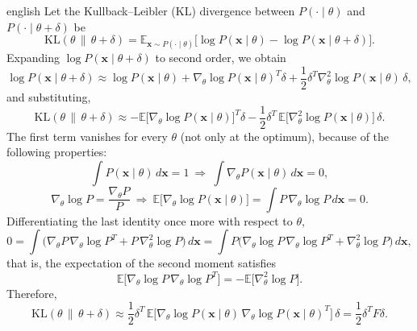 \documentclass[../0000.tex]{subfiles}
\begin{document}
\begin{hyphenrules}{english}
Let the Kullback--Leibler (KL) divergence between $P(\cdot\mid\theta)$ and $P(\cdot\mid\theta+\delta)$ be
\cite{pascanu2013}
\[
  \mathrm{KL}(\theta\,\|\,\theta+\delta)=\mathbb{E}_{\mathbf{x}\sim P(\cdot\mid\theta)}\big[\log P(\mathbf{x}\mid\theta)-\log P(\mathbf{x}\mid\theta+\delta)\big].
\]
Expanding $\log P(\mathbf{x}\mid\theta+\delta)$ to second order, we obtain
\[
  \log P(\mathbf{x}\mid\theta+\delta)\approx\log P(\mathbf{x}\mid\theta)+\nabla_\theta\log P(\mathbf{x}\mid\theta)^{T}\delta
  +\frac12\delta^{T}\nabla^2_\theta\log P(\mathbf{x}\mid\theta)\,\delta,
\]
and substituting,
\begin{equation}
  \mathrm{KL}(\theta\,\|\,\theta+\delta)\approx-\mathbb{E}\big[\nabla_\theta\log P(\mathbf{x}\mid\theta)\big]^{T}\delta
  -\frac12\delta^{T}\,\mathbb{E}\big[\nabla^2_\theta\log P(\mathbf{x}\mid\theta)\big]\,\delta.
  \label{eq:app-kl}
\end{equation}
The first term vanishes for every $\theta$ (not only at the optimum), because of the following properties:
\[
  \int P(\mathbf{x}\mid\theta)\,d\mathbf{x}=1\ \Rightarrow\ \int\nabla_\theta P(\mathbf{x}\mid\theta)\,d\mathbf{x}=0,
\]
\[
  \nabla_\theta\log P=\frac{\nabla_\theta P}{P}\ \Rightarrow\
  \mathbb{E}\big[\nabla_\theta\log P(\mathbf{x}\mid\theta)\big]=\int P\,\nabla_\theta\log P\,d\mathbf{x}=0.
\]
Differentiating the last identity once more with respect to $\theta$,
\[
  0=\int\Big(\nabla_\theta P\,\nabla_\theta\log P^{T}+P\,\nabla^2_\theta\log P\Big)\,d\mathbf{x}
   =\int P\Big(\nabla_\theta\log P\,\nabla_\theta\log P^{T}+\nabla^2_\theta\log P\Big)\,d\mathbf{x},
\]
that is, the expectation of the second moment satisfies
\[
  \mathbb{E}\big[\nabla_\theta\log P\,\nabla_\theta\log P^{T}\big]=-\mathbb{E}\big[\nabla^2_\theta\log P\big].
\]
Therefore,
\[
  \mathrm{KL}(\theta\,\|\,\theta+\delta)\approx\frac12\delta^{T}\,
  \mathbb{E}\big[\nabla_\theta\log P(\mathbf{x}\mid\theta)\,\nabla_\theta\log P(\mathbf{x}\mid\theta)^{T}\big]\,\delta
  =\frac12\delta^{T}F\delta.
\]

\end{hyphenrules}

\ifSubfilesClassLoaded{}{}
\end{document}
